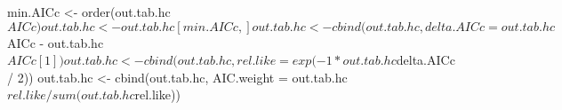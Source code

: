 \begin{Schunk}
\begin{Sinput}
 min.AICc <- order(out.tab.hc$AICc)
 out.tab.hc <- out.tab.hc[min.AICc, ]
 out.tab.hc <- cbind(out.tab.hc, delta.AICc = out.tab.hc$AICc - out.tab.hc$AICc[1])
 out.tab.hc <- cbind(out.tab.hc, rel.like = exp(-1 * out.tab.hc$delta.AICc / 2))
 out.tab.hc <- cbind(out.tab.hc, AIC.weight = out.tab.hc$rel.like / sum(out.tab.hc$rel.like))
\end{Sinput}
\end{Schunk}
